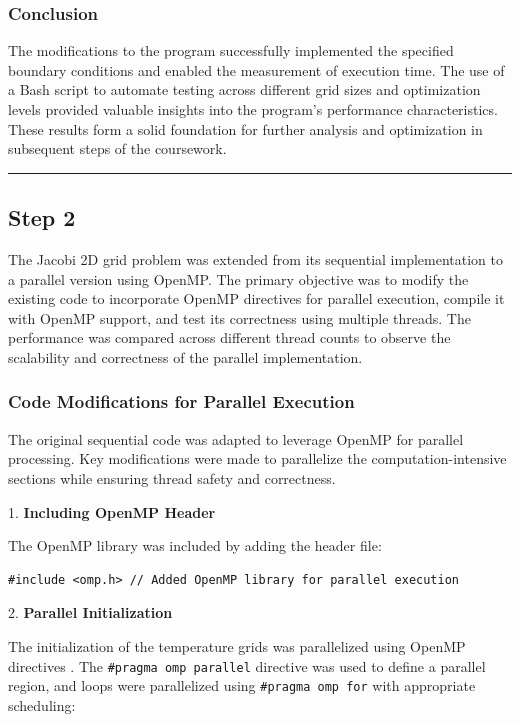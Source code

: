 \documentclass{article}
\begin{document}
\subsubsection{Conclusion}

The modifications to the program successfully implemented the specified boundary conditions and enabled the measurement of execution time. The use of a Bash script to automate testing across different grid sizes and optimization levels provided valuable insights into the program's performance characteristics. These results form a solid foundation for further analysis and optimization in subsequent steps of the coursework.

\rule{\linewidth}{0.5pt}

\subsection{Step 2}

The Jacobi 2D grid problem was extended from its sequential implementation to a parallel version using OpenMP. The primary objective was to modify the existing code to incorporate OpenMP directives for parallel execution, compile it with OpenMP support, and test its correctness using multiple threads. The performance was compared across different thread counts to observe the scalability and correctness of the parallel implementation.

\subsubsection{Code Modifications for Parallel Execution}

The original sequential code was adapted to leverage OpenMP for parallel processing. Key modifications were made to parallelize the computation-intensive sections while ensuring thread safety and correctness.

1. \textbf{Including OpenMP Header}

   The OpenMP library was included by adding the header file:

   \begin{lstlisting}[style=CStyle, caption={OpenMP Header Inclusion}]
   #include <omp.h> // Added OpenMP library for parallel execution
   \end{lstlisting}

2. \textbf{Parallel Initialization}

    The initialization of the temperature grids was parallelized using OpenMP directives \parencite{chapman2007openmp}. The \texttt{\#pragma omp parallel} directive was used to define a parallel region, and loops were parallelized using \texttt{\#pragma omp for} with appropriate scheduling:
\end{document}
